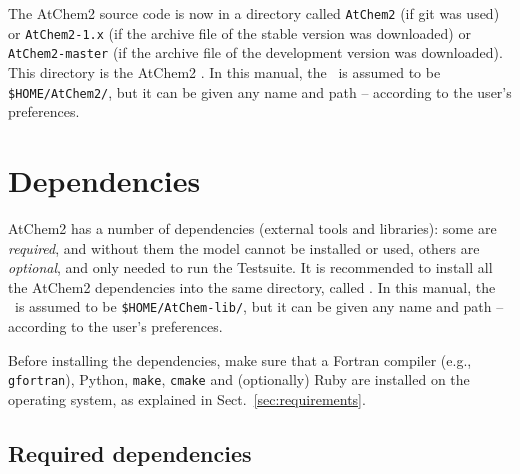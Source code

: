The AtChem2 source code is now in a directory called \texttt{AtChem2}
(if git was used) or \texttt{AtChem2-1.x} (if the archive file of the
stable version was downloaded) or \texttt{AtChem2-master} (if the
archive file of the development version was downloaded). This
directory is the AtChem2 \maindir. In this manual, the \maindir\ is
assumed to be \texttt{\$HOME/AtChem2/}, but it can be given any name
and path -- according to the user's preferences.

\section{Dependencies} \label{sec:dependencies}

AtChem2 has a number of dependencies (external tools and libraries):
some are \emph{required}, and without them the model cannot be
installed or used, others are \emph{optional}, and only needed to run
the Testsuite. It is recommended to install all the AtChem2
dependencies into the same directory, called \depdir. In this manual,
the \depdir\ is assumed to be \texttt{\$HOME/AtChem-lib/}, but it can
be given any name and path -- according to the user's preferences.

Before installing the dependencies, make sure that a Fortran compiler
(e.g., \texttt{gfortran}), Python, \texttt{make}, \texttt{cmake} and
(optionally) Ruby are installed on the operating system, as explained
in Sect.~\ref{sec:requirements}.

\subsection{Required dependencies} \label{subsec:required-dependencies}



